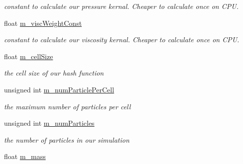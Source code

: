 \begin{DoxyCompactItemize}
\begin{DoxyCompactList}\small\item\em constant to calculate our pressure kernal. Cheaper to calculate once on C\-P\-U. \end{DoxyCompactList}\item 
\hypertarget{class_s_p_h_engine_ab9cc2ab7a2caed7c9a7a29b56285af05}{float \hyperlink{class_s_p_h_engine_ab9cc2ab7a2caed7c9a7a29b56285af05}{m\-\_\-visc\-Weight\-Const}}\label{class_s_p_h_engine_ab9cc2ab7a2caed7c9a7a29b56285af05}

\begin{DoxyCompactList}\small\item\em constant to calculate our viscosity kernal. Cheaper to calculate once on C\-P\-U. \end{DoxyCompactList}\item 
\hypertarget{class_s_p_h_engine_aec655d6cf4f291f096a3a00118944fae}{float \hyperlink{class_s_p_h_engine_aec655d6cf4f291f096a3a00118944fae}{m\-\_\-cell\-Size}}\label{class_s_p_h_engine_aec655d6cf4f291f096a3a00118944fae}

\begin{DoxyCompactList}\small\item\em the cell size of our hash function \end{DoxyCompactList}\item 
\hypertarget{class_s_p_h_engine_a751b81e76082f5e8aa030a6d7e4f339e}{unsigned int \hyperlink{class_s_p_h_engine_a751b81e76082f5e8aa030a6d7e4f339e}{m\-\_\-num\-Particle\-Per\-Cell}}\label{class_s_p_h_engine_a751b81e76082f5e8aa030a6d7e4f339e}

\begin{DoxyCompactList}\small\item\em the maximum number of particles per cell \end{DoxyCompactList}\item 
\hypertarget{class_s_p_h_engine_a1b1e56bc8e188a5c85bbadb9d3ff0d6b}{unsigned int \hyperlink{class_s_p_h_engine_a1b1e56bc8e188a5c85bbadb9d3ff0d6b}{m\-\_\-num\-Particles}}\label{class_s_p_h_engine_a1b1e56bc8e188a5c85bbadb9d3ff0d6b}

\begin{DoxyCompactList}\small\item\em the number of particles in our simulation \end{DoxyCompactList}\item 
\hypertarget{class_s_p_h_engine_a6537ae88a9250d75192b1a9fdab1645d}{float \hyperlink{class_s_p_h_engine_a6537ae88a9250d75192b1a9fdab1645d}{m\-\_\-mass}}\label{class_s_p_h_engine_a6537ae88a9250d75192b1a9fdab1645d}


\end{DoxyCompactItemize}
